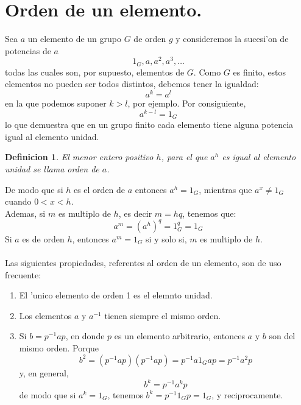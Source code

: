 \documentclass[a4paper,openright,12pt]{book}
\numberwithin{equation}{section} %
\newtheorem{definicion}{Definicion}[section] %
\begin{document}
\section{Orden de un elemento.}
Sea $a$ un elemento de un grupo $G$ de orden $g$ y consideremos la sucesi'on de potencias de $a$
\[
1_{G},a,a^{2},a^{3},\ldots
\]
todas las cuales son, por supuesto, elementos de $G$. Como $G$ es finito, estos elementos no pueden ser todos distintos, debemos tener la igualdad:
\[
a^{k}=a^{l}
\]
en la que podemos suponer $k>l$, por ejemplo. Por consiguiente,
\[
a^{k-l}=1_{G}
\]
lo que demuestra que en un grupo finito cada elemento tiene alguna potencia igual al elemento unidad.
\begin{definicion}
El menor entero positivo $h$, para el que $a^{h}$ es igual al elemento unidad se llama orden de $a$.
\end{definicion}
De modo que si $h$ es el orden de $a$ entonces $a^{h}=1_{G}$, mientras que $a^{x}\neq
1_{G}$ cuando $0<x<h$.\\
Ademas, si $m$ es multiplo de $h$, es decir $m=hq$, tenemos que:
\[
a^{m}=(a^{h})^{q}=1_{G}^{q}=1_{G}
\]
Si $a$ es de orden $h$, entonces $a^{m}=1_{G}$ si y solo si, $m$ es multiplo de $h$.\\
\\
Las siguientes propiedades, referentes al orden de un elemento, son de uso frecuente:
\begin{enumerate}
\item El 'unico elemento de orden 1 es el elemnto unidad.
\item Los elementos $a$ y $a^{-1}$  tienen siempre el mismo orden.
\item Si $b=p^{-1}ap$, en donde $p$ es un elemento arbitrario, entonces $a$ y $b$ son del mismo orden. Porque 
\[
b^{2}=(p^{-1}ap)(p^{-1}ap)=p^{-1}a1_{G}ap=p^{-1}a^{2}p
\]
y, en general,
\[
b^{k}=p^{-1}a^{k}p
\]
de modo que si $a^{k}=1_{G}$, tenemos $b^{k}=p^{-1}1_{G}p=1_{G}$, y reciprocamente.
\end{enumerate}
\end{document}
